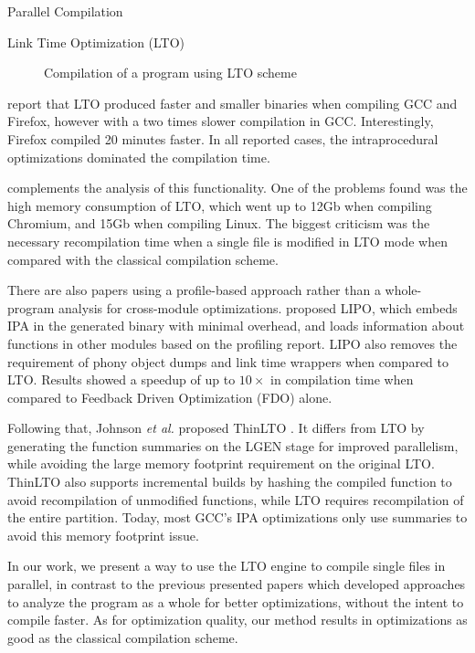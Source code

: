 \begin{section}{Parallel Compilation}
\begin{subsection}{Link Time Optimization (LTO)}
\begin{figure}
{{\begin{tikzpicture}[node distance = 3cm, auto]
\end{tikzpicture}
}
}%
\caption{Compilation of a program using LTO scheme}
\label{fig:whopr_build}
\end{figure}

\cite{glek2010optimizing} report that LTO produced faster and smaller binaries when compiling GCC
and Firefox, however with a two times slower compilation in GCC. Interestingly,
Firefox compiled 20 minutes faster. In all reported cases, the intraprocedural
optimizations dominated the compilation time.

\cite{livska2014optimizing} complements the analysis of this functionality. One
of the problems found was the high memory consumption of LTO, which went up to
12Gb when compiling Chromium, and 15Gb when compiling Linux. The biggest
criticism was the necessary recompilation time when a single file is modified
in LTO mode when compared with the classical compilation scheme.

There are also papers using a profile-based approach rather than a
whole-program analysis for cross-module optimizations.  proposed LIPO, which
embeds IPA in the generated binary with minimal overhead, and loads information
about functions in other modules based on the profiling report. LIPO also
removes the requirement of phony object dumps and link time wrappers when
compared to LTO. Results showed a speedup of up to $10\times$ in compilation
time when compared to Feedback Driven Optimization (FDO) alone.

Following that, Johnson \textit{et al.} proposed ThinLTO \citep{thinlto}. It
differs from LTO by generating the function summaries on the LGEN stage for
improved parallelism, while avoiding the large memory footprint requirement on the
original LTO. ThinLTO also supports incremental builds by hashing the compiled
function to avoid recompilation of unmodified functions, while LTO requires
recompilation of the entire partition. Today, most GCC's IPA
optimizations only use summaries to avoid this memory footprint issue.

In our work, we present a way to use the LTO engine to compile single files in
parallel, in contrast to the previous presented papers which developed
approaches to analyze the program as a whole for better optimizations, without
the intent to compile faster. As for optimization quality, our method results
in optimizations as good as the classical compilation scheme.

\end{subsection}
\end{section}


